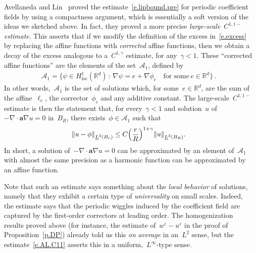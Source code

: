 \documentclass[11pt,twoside]{article} %
\numberwithin{equation}{section}
\theoremstyle{definition}
\let\originalleft\left
\let\originalright\right
\renewcommand{\left}{\mathopen{}\mathclose\bgroup\originalleft}
\renewcommand{\right}{\aftergroup\egroup\originalright}
\newcommand*{\Rd}{\ensuremath{\mathbb{R}^d}}
\newcommand{\eps}{\varepsilon}
\newcommand{\ep}{\eps}
\renewcommand{\a}{\mathbf{a}}
\begin{document}
Avellaneda and Lin~\cite{AL1} proved the estimate~\eqref{e.lipbound.pre} for periodic coefficient fields by using a compactness argument, which is essentially a soft version of the ideas we sketched above. In fact, they proved a more precise \emph{large-scale~$C^{1,1-}$ estimate}. This asserts that if we modify the definition of the excess in~\eqref{e.excess} by replacing the affine functions with \emph{corrected} affine functions, then we obtain a decay of the excess analogous to a~$C^{1,\gamma}$ estimate, for any~$\gamma<1$. 
These ``corrected affine functions'' are the elements of the set~$\mathcal{A}_1$, defined by
\begin{align*}  
\mathcal{A}_1 = \bigl\{ \psi \in H^1_{\mathrm{loc}}(\Rd) \, : \, \nabla \psi = e + \nabla \phi_e \quad \mbox{for some} \ e \in \Rd \bigr\} \,.
\end{align*}
In other words,~$\mathcal{A}_1$ is the set of solutions which, for some~$e\in\Rd$, are the sum of the affine~$\ell_e$, the corrector~$\phi_e$ and any additive constant. The large-scale~$C^{1,1-}$ estimate is then the statement that, for every~$\gamma<1$ and solution~$u$ of~$-\nabla \cdot \a\nabla u = 0$ in~$B_R$, there exists~$\phi \in \mathcal{A}_1$ such that 
\begin{equation}
\label{e.AL.C11}
\left\| u - \phi \right\|_{\underline{L}^2(B_r)} 
\leq 
C \left( \frac r R \right)^{1+\gamma} 
\left\| u  \right\|_{\underline{L}^2(B_R)}.
\end{equation}
In short, a solution of~$-\nabla \cdot \a\nabla u=0$ can be approximated by an element of~$\mathcal{A}_1$ with almost the same precision as a harmonic function can be approximated by an affine function. 

\smallskip

Note that such an estimate says something about the \emph{local behavior} of solutions, 
namely that they exhibit a certain type of \emph{universality} on small scales.
Indeed, the estimate says that the periodic wiggles induced by the coefficient field are captured by the first-order correctors at leading order. The homogenization results proved above (for instance, the estimate of~$w^\ep - u^\ep$ in the proof of Proposition~\ref{p.DP}) already told us this \emph{on average} in an~$L^2$ sense, but the estimate~\eqref{e.AL.C11} asserts this in a uniform,~$L^\infty$-type sense. 

\smallskip
\end{document}
